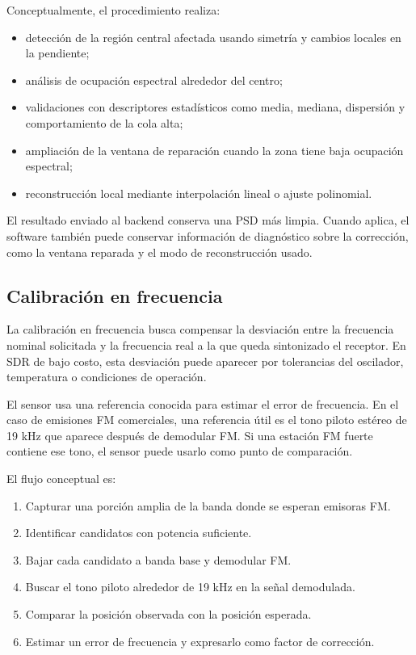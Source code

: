 Conceptualmente, el procedimiento realiza:

\begin{itemize}
  \item detección de la región central afectada usando simetría y cambios locales
  en la pendiente;
  \item análisis de ocupación espectral alrededor del centro;
  \item validaciones con descriptores estadísticos como media, mediana,
  dispersión y comportamiento de la cola alta;
  \item ampliación de la ventana de reparación cuando la zona tiene baja
  ocupación espectral;
  \item reconstrucción local mediante interpolación lineal o ajuste polinomial.
\end{itemize}

El resultado enviado al backend conserva una PSD más limpia. Cuando aplica, el
software también puede conservar información de diagnóstico sobre la corrección,
como la ventana reparada y el modo de reconstrucción usado.

\subsection{Calibración en frecuencia}

La calibración en frecuencia busca compensar la desviación entre la frecuencia
nominal solicitada y la frecuencia real a la que queda sintonizado el receptor.
En SDR de bajo costo, esta desviación puede aparecer por tolerancias del oscilador,
temperatura o condiciones de operación.

El sensor usa una referencia conocida para estimar el error de frecuencia. En el
caso de emisiones FM comerciales, una referencia útil es el tono piloto estéreo de
19 kHz que aparece después de demodular FM. Si una estación FM fuerte contiene ese
tono, el sensor puede usarlo como punto de comparación.

El flujo conceptual es:

\begin{enumerate}
  \item Capturar una porción amplia de la banda donde se esperan emisoras FM.
  \item Identificar candidatos con potencia suficiente.
  \item Bajar cada candidato a banda base y demodular FM.
  \item Buscar el tono piloto alrededor de 19 kHz en la señal demodulada.
  \item Comparar la posición observada con la posición esperada.
  \item Estimar un error de frecuencia y expresarlo como factor de corrección.
\end{enumerate}

